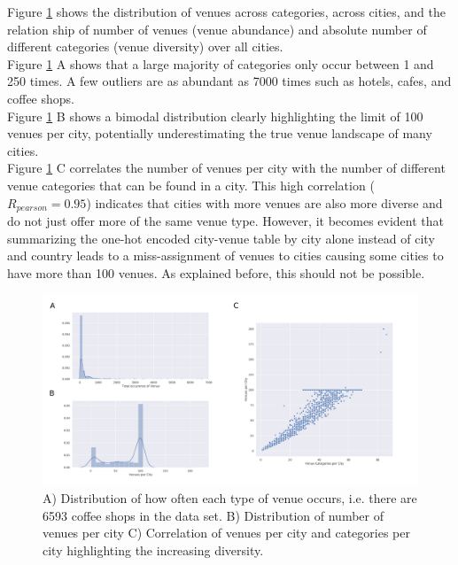 \documentclass[11pt,a4paper,final]{article}
\begin{document}
Figure \ref{fig:histograms} shows the distribution of venues across categories, across cities, and the relation ship of number of venues (venue abundance) and absolute number of different categories (venue diversity) over all cities. \\
Figure \ref{fig:histograms} A shows that a large majority of categories only occur between 1 and 250 times. A few outliers are as abundant as 7000 times such as hotels, cafes, and coffee shops. \\ 
Figure \ref{fig:histograms} B shows a bimodal distribution clearly highlighting the limit of 100 venues per city, potentially underestimating the true venue landscape of many cities.\\
Figure \ref{fig:histograms} C correlates the number of venues per city with the number of different venue categories that can be found in a city. This high correlation ($R_{pearson} = 0.95$) indicates that cities with more venues are also more diverse and do not just offer more of the same venue type. However, it becomes evident that summarizing the one-hot encoded city-venue table by city alone instead of city and country leads to a miss-assignment of venues to cities causing some cities to have more than 100 venues. As explained before, this should not be possible.

\begin{figure}[h!]
\begin{center}
\includegraphics[width = 1\textwidth]{figures/fig2.pdf} 
\caption{A) Distribution of how often each type of venue occurs, i.e. there are 6593 coffee shops in the data set. B) Distribution of number of venues per city C) Correlation of venues per city and categories per city highlighting the increasing diversity.}\label{fig:histograms}
\end{center}
\end{figure}
\end{document}
